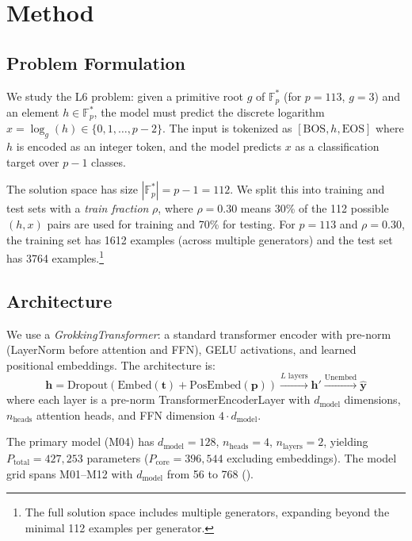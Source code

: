 \documentclass[11pt]{article}
\newcommand{\Fps}{\mathbb{F}_p^*}
\newcommand{\Pcore}{P_{\mathrm{core}}}
\newcommand{\Ptotal}{P_{\mathrm{total}}}
\newcommand{\dmodel}{d_{\mathrm{model}}}
\newcommand{\nheads}{n_{\mathrm{heads}}}
\newcommand{\nlayers}{n_{\mathrm{layers}}}
\begin{document}
\section{Method}
\label{sec:method}

\subsection{Problem Formulation}

We study the L6 problem: given a primitive root $g$ of $\Fps$ (for $p = 113$, $g = 3$) and an element $h \in \Fps$, the model must predict the discrete logarithm $x = \log_g(h) \in \{0, 1, \ldots, p-2\}$. The input is tokenized as $[\mathrm{BOS}, h, \mathrm{EOS}]$ where $h$ is encoded as an integer token, and the model predicts $x$ as a classification target over $p - 1$ classes.

The solution space has size $|\Fps| = p - 1 = 112$. We split this into training and test sets with a \emph{train fraction} $\rho$, where $\rho = 0.30$ means 30\% of the 112 possible $(h, x)$ pairs are used for training and 70\% for testing. For $p = 113$ and $\rho = 0.30$, the training set has 1612 examples (across multiple generators) and the test set has 3764 examples.\footnote{The full solution space includes multiple generators, expanding beyond the minimal 112 examples per generator.}

\subsection{Architecture}

We use a \emph{GrokkingTransformer}: a standard transformer encoder with pre-norm (LayerNorm before attention and FFN), GELU activations, and learned positional embeddings. The architecture is:
\begin{equation}
    \mathbf{h} = \mathrm{Dropout}(\mathrm{Embed}(\mathbf{t}) + \mathrm{PosEmbed}(\mathbf{p}))
    \xrightarrow{\text{$L$ layers}} \mathbf{h}'
    \xrightarrow{\text{Unembed}} \hat{\mathbf{y}}
\end{equation}
where each layer is a pre-norm TransformerEncoderLayer \citep{vaswani2017attention} with $\dmodel$ dimensions, $\nheads$ attention heads, and FFN dimension $4 \cdot \dmodel$.

The primary model (M04) has $\dmodel = 128$, $\nheads = 4$, $\nlayers = 2$, yielding $\Ptotal = 427{,}253$ parameters ($\Pcore = 396{,}544$ excluding embeddings). The model grid spans M01--M12 with $\dmodel$ from 56 to 768 ().
\end{document}
